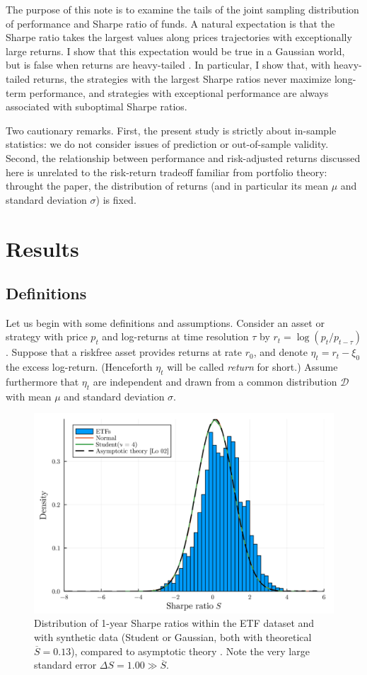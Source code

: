 \documentclass[
reprint,
amsmath,amssymb,
aps,
]{revtex4-2}
\begin{document}
The purpose of this note is to examine the tails of the joint sampling distribution of performance and Sharpe ratio of funds.
A natural expectation is that the Sharpe ratio takes the largest values along prices trajectories with exceptionally large returns.
I show that this expectation would be true in a Gaussian world, but is false when returns are heavy-tailed \cite{bouchaudTheory2003}. 
In particular, I show that, with heavy-tailed returns, the strategies with the largest Sharpe ratios never maximize long-term performance, and strategies with exceptional performance are always associated with suboptimal Sharpe ratios. 

Two cautionary remarks. 
First, the present study is strictly about in-sample statistics: we do not consider issues of prediction or out-of-sample validity.  
Second, the relationship between performance and risk-adjusted returns discussed here is unrelated to the risk-return tradeoff familiar from portfolio theory: throught the paper, the distribution of returns (and in particular its mean $\mu$ and standard deviation $\sigma$) is fixed. 

\section{Results}

\subsection{Definitions}

Let us begin with some definitions and assumptions.
Consider an asset or strategy with price $p_t$ and log-returns at time resolution $\tau$ by $r_t = \log(p_t/p_{t-\tau})$.
Suppose that a riskfree asset provides returns at rate $r_0$, and denote $\eta_t = r_t - \xi_0$ the excess log-return. 
(Henceforth $\eta_t$ will be called \emph{return} for short.)
Assume furthermore that $\eta_t$ are independent and drawn from a common distribution $\mathcal{D}$ with mean $\mu$ and standard deviation $\sigma$. 

\begin{figure}[t!]
    \includegraphics[width = .45\textwidth]{sharpe-dist.png}
    \caption{
        Distribution of 1-year Sharpe ratios within the ETF dataset and with synthetic data (Student or Gaussian, both with theoretical $\overline{S} = 0.13$), compared to asymptotic theory \cite{loStatistics2002}. 
        Note the very large standard error $\Delta S = 1.00 \gg \overline{S}$.
        }
    \label{sharpe-dist}
\end{figure}
\end{document}
